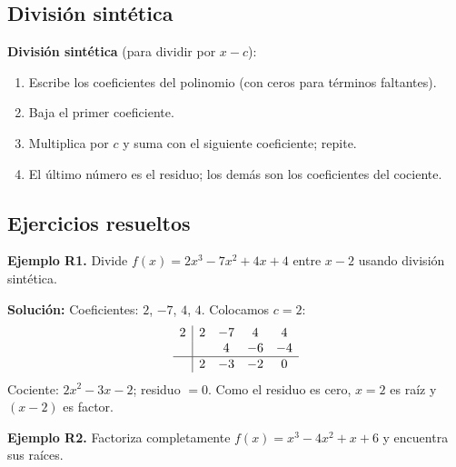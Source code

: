 \documentclass[12pt, a4paper]{article}
\begin{document}
\subsection{División sintética}

\begin{cuadroadvertencia}
  \textbf{División sintética} (para dividir por $x - c$):
  \begin{enumerate}[leftmargin=*]
    \item Escribe los coeficientes del polinomio (con ceros para términos faltantes).
    \item Baja el primer coeficiente.
    \item Multiplica por $c$ y suma con el siguiente coeficiente; repite.
    \item El último número es el residuo; los demás son los coeficientes del cociente.
  \end{enumerate}
\end{cuadroadvertencia}

\subsection{Ejercicios resueltos}

\textbf{Ejemplo R1.} Divide $f(x) = 2x^3 - 7x^2 + 4x + 4$ entre $x - 2$ usando división sintética.

\begin{cuadrosolucion}
  \textbf{Solución:} Coeficientes: $2$, $-7$, $4$, $4$. Colocamos $c = 2$:
  \[
    \begin{array}{c|cccc}
      2 & 2 & -7 & 4  & 4  \\
        &   & 4  & -6 & -4 \\
      \hline
        & 2 & -3 & -2 & 0  \\
    \end{array}
  \]
  Cociente: $2x^2 - 3x - 2$; residuo $= 0$. Como el residuo es cero, $x = 2$ es raíz y $(x - 2)$ es factor.
\end{cuadrosolucion}

\newpage

\textbf{Ejemplo R2.} Factoriza completamente $f(x) = x^3 - 4x^2 + x + 6$ y encuentra sus raíces.
\end{document}
